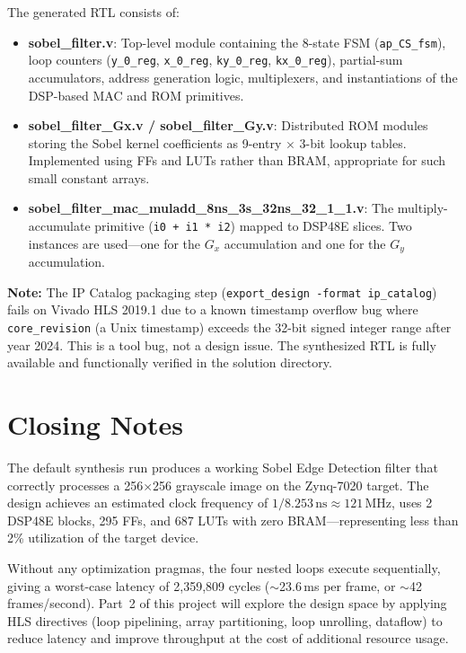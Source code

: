 \documentclass[11pt,letterpaper]{article}
\begin{document}
\noindent The generated RTL consists of:
\begin{itemize}
  \item \textbf{sobel\_filter.v}: Top-level module containing the 8-state FSM
        (\texttt{ap\_CS\_fsm}), loop counters (\texttt{y\_0\_reg}, \texttt{x\_0\_reg},
        \texttt{ky\_0\_reg}, \texttt{kx\_0\_reg}), partial-sum accumulators, address generation
        logic, multiplexers, and instantiations of the DSP-based MAC and ROM primitives.

  \item \textbf{sobel\_filter\_Gx.v / sobel\_filter\_Gy.v}: Distributed ROM modules storing
        the Sobel kernel coefficients as 9-entry $\times$ 3-bit lookup tables. Implemented using
        FFs and LUTs rather than BRAM, appropriate for such small constant arrays.

  \item \textbf{sobel\_filter\_mac\_muladd\_8ns\_3s\_32ns\_32\_1\_1.v}: The multiply-accumulate
        primitive (\texttt{i0 + i1 * i2}) mapped to DSP48E slices. Two instances are used---one
        for the $G_x$ accumulation and one for the $G_y$ accumulation.
\end{itemize}

\textbf{Note:} The IP Catalog packaging step (\texttt{export\_design -format ip\_catalog}) fails
on Vivado HLS 2019.1 due to a known timestamp overflow bug where \texttt{core\_revision} (a Unix
timestamp) exceeds the 32-bit signed integer range after year 2024. This is a tool bug, not a
design issue. The synthesized RTL is fully available and functionally verified in the solution
directory.

\section*{Closing Notes}

The default synthesis run produces a working Sobel Edge Detection filter that correctly processes
a 256$\times$256 grayscale image on the Zynq-7020 target. The design achieves an estimated clock
frequency of $1/8.253\,\mathrm{ns} \approx 121\,\mathrm{MHz}$, uses 2 DSP48E blocks, 295 FFs,
and 687 LUTs with zero BRAM---representing less than 2\% utilization of the target device.

Without any optimization pragmas, the four nested loops execute sequentially, giving a worst-case
latency of 2,359,809 cycles ($\sim$23.6\,ms per frame, or $\sim$42 frames/second).
Part~2 of this project will explore the design space by applying HLS directives (loop pipelining,
array partitioning, loop unrolling, dataflow) to reduce latency and improve throughput at the
cost of additional resource usage.
\end{document}
